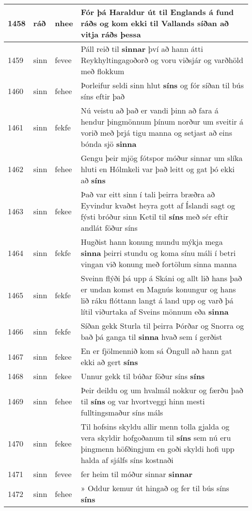 \documentclass{article}
\begin{document}
\begin{longtable}{p{1cm}|p{1cm}|p{1cm}|p{13cm}}
\hline
1458&ráð&nhee&Fór þá Haraldur út til Englands á fund \textbf{ráðs} og kom ekki til Vallands síðan að vitja ráðs þessa\\
\hline
1459&sinn&fevee&Páll reið til \textbf{sinnar} því að hann átti Reykhyltingagoðorð og voru viðsjár og varðhöld með flokkum\\
\hline
1460&sinn&fehee&Þorleifur seldi sinn hlut \textbf{síns} og fór síðan til bús síns eftir það\\
\hline
1461&sinn&fekfe&Nú veistu að það er vandi þinn að fara á hendur þingmönnum þínum norður um sveitir á vorið með þrjá tigu manna og setjast að eins bónda sjö \textbf{sinna} \\
\hline
1462&sinn&fehee&Gengu þeir mjög fótspor móður sinnar um slíka hluti en Hólmkeli var það leitt og gat þó ekki að \textbf{síns} \\
\hline
1463&sinn&fekee&Það var eitt sinn í tali þeirra bræðra að Eyvindur kvaðst heyra gott af Íslandi sagt og fýsti bróður sinn Ketil til \textbf{síns} með sér eftir andlát föður síns\\
\hline
1464&sinn&fekfe&Hugðist hann konung mundu mýkja mega \textbf{sinna} þeirri stundu og koma sínu máli í betri vingan við konung með fortölum sinna manna\\
\hline
1465&sinn&fekfe&Sveinn flýði þá upp á Skáni og allt lið hans það er undan komst en Magnús konungur og hans lið ráku flóttann langt á land upp og varð þá lítil viðurtaka af Sveins mönnum eða \textbf{sinna} \\
\hline
1466&sinn&fekfe&Síðan gekk Sturla til þeirra Þórðar og Snorra og bað þá ganga til \textbf{sinna} hvað sem í gerðist\\
\hline
1467&sinn&fekee&En er fjölmennið kom sá Öngull að hann gat ekki að gert \textbf{síns} \\
\hline
1468&sinn&fekee&Unnur gekk til búðar föður síns \textbf{síns} \\
\hline
1469&sinn&fehee&Þeir deildu og um hvalmál nokkur og færðu það til \textbf{síns} og var hvortveggi hinn mesti fulltingsmaður síns máls\\
\hline
1470&sinn&fekee&Til hofsins skyldu allir menn tolla gjalda og vera skyldir hofgoðanum til \textbf{síns} sem nú eru þingmenn höfðingjum en goði skyldi hofi upp halda af sjálfs síns kostnaði\\
\hline
1471&sinn&fevee&fer heim til móður sinnar \textbf{sinnar} \\
\hline
1472&sinn&fehee&» Oddur kemur út hingað og fer til bús síns \textbf{síns} \\

\end{longtable}
\end{document}
